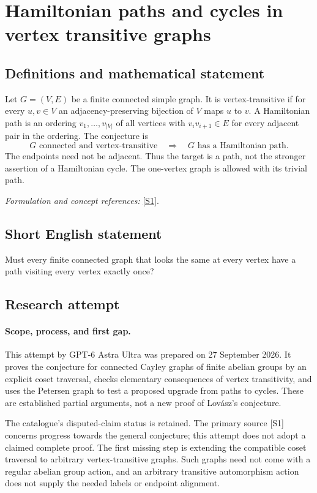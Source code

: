 \documentclass[11pt]{article}
\begin{document}
\section*{\texorpdfstring{Hamiltonian paths and cycles in vertex transitive graphs}{Hamiltonian paths and cycles in vertex transitive graphs}}\label{3144}
\subsection{Definitions and mathematical statement}
Let $G=(V,E)$ be a finite connected simple graph. It is vertex-transitive if for every $u,v\in V$ an adjacency-preserving bijection of $V$ maps $u$ to $v$. A Hamiltonian path is an ordering $v_1,\ldots,v_{|V|}$ of all vertices with $v_iv_{i+1}\in E$ for every adjacent pair in the ordering. The conjecture is
\[
 G\text{ connected and vertex-transitive}
 \quad\Longrightarrow\quad G\text{ has a Hamiltonian path}.
\]
The endpoints need not be adjacent. Thus the target is a path, not the stronger assertion of a Hamiltonian cycle. The one-vertex graph is allowed with its trivial path.
\par\smallskip\textit{Formulation and concept references:} \href{https://arxiv.org/abs/2606.09742}{[S1]}.

\subsection{Short English statement}
Must every finite connected graph that looks the same at every vertex have a path visiting every vertex exactly once?
\subsection{Research attempt}
\paragraph{Scope, process, and first gap.}
This attempt by GPT-6 Astra Ultra was prepared on 27 September 2026. It proves the conjecture for connected Cayley graphs of finite abelian groups by an explicit coset traversal, checks elementary consequences of vertex transitivity, and uses the Petersen graph to test a proposed upgrade from paths to cycles. These are established partial arguments, not a new proof of Lovász's conjecture.

The catalogue's disputed-claim status is retained. The primary source [S1] concerns progress towards the general conjecture; this attempt does not adopt a claimed complete proof. The first missing step is extending the compatible coset traversal to arbitrary vertex-transitive graphs. Such graphs need not come with a regular abelian group action, and an arbitrary transitive automorphism action does not supply the needed labels or endpoint alignment.
\end{document}
